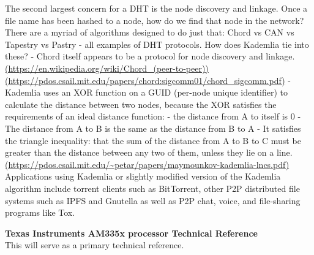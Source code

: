 \documentclass[12pt]{article}
\begin{document}
    The second largest concern for a DHT is the node discovery and linkage.
    Once a file name has been hashed to a node, how do we find that node in the
    network?  There are a myriad of algorithms designed to do just that:
    Chord vs CAN vs Tapestry vs Pastry
    - all examples of DHT protocols.  How does Kademlia tie into these?
    - Chord itself appears to be a protocol for node discovery and linkage.
      \url{(https://en.wikipedia.org/wiki/Chord_(peer-to-peer))}
      \url{(https://pdos.csail.mit.edu/papers/chord:sigcomm01/chord_sigcomm.pdf)}
    - Kademlia uses an XOR function on a GUID (per-node unique identifier) to
      calculate the distance between two nodes, because the XOR satisfies the
      requirements of an ideal distance function:
      - the distance from A to itself is 0
      - The distance from A to B is the same as the distance from B to A
      - It satisfies the triangle inequality: that the sum of the distance from
        A to B to C must be greater than the distance between any two of them,
        unless they lie on a line.
      \url{(https://pdos.csail.mit.edu/~petar/papers/maymounkov-kademlia-lncs.pdf)}
      Applications using Kademlia or slightly modified version of the Kademlia
      algorithm include torrent clients such as BitTorrent, other P2P
      distributed file systems such as IPFS and Gnutella as well as P2P chat,
      voice, and file-sharing programs like Tox.
	
	\begin{thebibliography}{1}
		\textbf{Texas Instruments AM335x processor Technical Reference}\\
            This will serve as a primary technical reference.
	\end{thebibliography}
\end{document}
